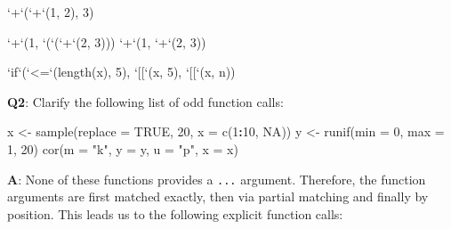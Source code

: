 \documentclass[
]{krantz}
\makeatletter
\newenvironment{Shaded}{\begin{snugshade}}{\end{snugshade}}
\newcommand{\DataTypeTok}[1]{\textcolor[rgb]{0.13,0.29,0.53}{#1}}
\newcommand{\DecValTok}[1]{\textcolor[rgb]{0.00,0.00,0.81}{#1}}
\newcommand{\KeywordTok}[1]{\textcolor[rgb]{0.13,0.29,0.53}{\textbf{#1}}}
\newcommand{\NormalTok}[1]{#1}
\newcommand{\OperatorTok}[1]{\textcolor[rgb]{0.81,0.36,0.00}{\textbf{#1}}}
\newcommand{\OtherTok}[1]{\textcolor[rgb]{0.56,0.35,0.01}{#1}}
\newcommand{\StringTok}[1]{\textcolor[rgb]{0.31,0.60,0.02}{#1}}
\newenvironment{kframe}{%
\medskip{}
\setlength{\fboxsep}{.8em}
 \def\at@end@of@kframe{}%
 \ifinner\ifhmode%
  \def\at@end@of@kframe{\end{minipage}}%
  \begin{minipage}{\columnwidth}%
 \fi\fi%
 \def\FrameCommand##1{\hskip\@totalleftmargin \hskip-\fboxsep
 \colorbox{shadecolor}{##1}\hskip-\fboxsep
     \hskip-\linewidth \hskip-\@totalleftmargin \hskip\columnwidth}%
 \MakeFramed {\advance\hsize-\width
   \@totalleftmargin\z@ \linewidth\hsize
   \@setminipage}}%
 {\par\unskip\endMakeFramed%
 \at@end@of@kframe}
\renewenvironment{Shaded}{\begin{kframe}}{\end{kframe}}
\renewcommand{\KeywordTok} [1]{\textcolor[rgb]{0.00,0.44,0.13}{{#1}}}
\renewcommand{\DataTypeTok}[1]{\textcolor[rgb]{0.56,0.13,0.00}{{#1}}}
\renewcommand{\DecValTok}  [1]{\textcolor[rgb]{0.25,0.63,0.44}{{#1}}}
\renewcommand{\StringTok}  [1]{\textcolor[rgb]{0.25,0.44,0.63}{{#1}}}
\renewcommand{\OtherTok}   [1]{\textcolor[rgb]{0.00,0.44,0.13}{{#1}}}
\renewcommand{\NormalTok}  [1]{{#1}}
\makeatother
\begin{document}
\begin{Shaded}
\begin{Highlighting}[]
\StringTok{`}\DataTypeTok{+}\StringTok{`}\NormalTok{(}\StringTok{`}\DataTypeTok{+}\StringTok{`}\NormalTok{(}\DecValTok{1}\NormalTok{, }\DecValTok{2}\NormalTok{), }\DecValTok{3}\NormalTok{)}

\StringTok{`}\DataTypeTok{+}\StringTok{`}\NormalTok{(}\DecValTok{1}\NormalTok{, }\StringTok{`}\DataTypeTok{(}\StringTok{`}\NormalTok{(}\StringTok{`}\DataTypeTok{+}\StringTok{`}\NormalTok{(}\DecValTok{2}\NormalTok{, }\DecValTok{3}\NormalTok{)))}
\StringTok{`}\DataTypeTok{+}\StringTok{`}\NormalTok{(}\DecValTok{1}\NormalTok{, }\StringTok{`}\DataTypeTok{+}\StringTok{`}\NormalTok{(}\DecValTok{2}\NormalTok{, }\DecValTok{3}\NormalTok{))}

\StringTok{`}\DataTypeTok{if}\StringTok{`}\NormalTok{(}\StringTok{`}\DataTypeTok{<=}\StringTok{`}\NormalTok{(}\KeywordTok{length}\NormalTok{(x), }\DecValTok{5}\NormalTok{), }\StringTok{`}\DataTypeTok{[[}\StringTok{`}\NormalTok{(x, }\DecValTok{5}\NormalTok{), }\StringTok{`}\DataTypeTok{[[}\StringTok{`}\NormalTok{(x, n))}
\end{Highlighting}
\end{Shaded}

\textbf{{Q2}}: Clarify the following list of odd function calls:

\begin{Shaded}
\begin{Highlighting}[]
\NormalTok{x <-}\StringTok{ }\KeywordTok{sample}\NormalTok{(}\DataTypeTok{replace =} \OtherTok{TRUE}\NormalTok{, }\DecValTok{20}\NormalTok{, }\DataTypeTok{x =} \KeywordTok{c}\NormalTok{(}\DecValTok{1}\OperatorTok{:}\DecValTok{10}\NormalTok{, }\OtherTok{NA}\NormalTok{))}
\NormalTok{y <-}\StringTok{ }\KeywordTok{runif}\NormalTok{(}\DataTypeTok{min =} \DecValTok{0}\NormalTok{, }\DataTypeTok{max =} \DecValTok{1}\NormalTok{, }\DecValTok{20}\NormalTok{)}
\KeywordTok{cor}\NormalTok{(}\DataTypeTok{m =} \StringTok{"k"}\NormalTok{, }\DataTypeTok{y =}\NormalTok{ y, }\DataTypeTok{u =} \StringTok{"p"}\NormalTok{, }\DataTypeTok{x =}\NormalTok{ x)}
\end{Highlighting}
\end{Shaded}

\textbf{{A}}: None of these functions provides a \texttt{...} argument. Therefore, the function arguments are first matched exactly, then via partial matching and finally by position. This leads us to the following explicit function calls:
\end{document}
